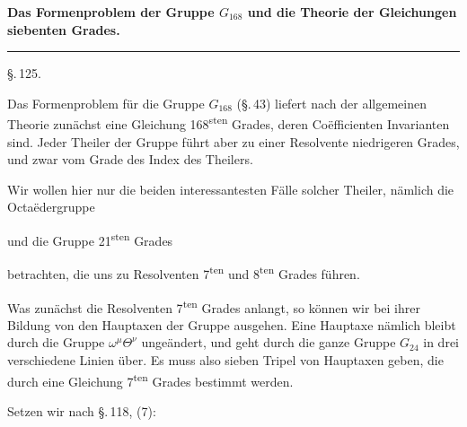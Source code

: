 
\begin{center}

\textbf{Das Formenproblem der Gruppe $G_{168}$ und die Theorie der Gleichungen siebenten Grades.}

\rule{4cm}{0.4pt}

\S.\,125.

\end{center}

Das Formenproblem für die Gruppe $G_{168}$ (\S.\,43) liefert nach der allgemeinen Theorie zunächst eine Gleichung 168\textsuperscript{sten} Grades, deren Coëfficienten Invarianten sind. Jeder Theiler der Gruppe führt aber zu einer Resolvente niedrigeren Grades, und zwar vom Grade des Index des Theilers.

Wir wollen hier nur die beiden interessantesten Fälle solcher Theiler, nämlich die Octaëdergruppe


und die Gruppe 21\textsuperscript{sten} Grades


betrachten, die uns zu Resolventen 7\textsuperscript{ten} und 8\textsuperscript{ten} Grades führen.

Was zunächst die Resolventen 7\textsuperscript{ten} Grades anlangt, so können wir bei ihrer Bildung von den Hauptaxen der Gruppe ausgehen. Eine Hauptaxe nämlich bleibt durch die Gruppe $\omega^\mu \Theta^\nu$ ungeändert, und geht durch die ganze Gruppe $G_{24}$ in drei verschiedene Linien über. Es muss also sieben Tripel von Hauptaxen geben, die durch eine Gleichung 7\textsuperscript{ten} Grades bestimmt werden.

Setzen wir nach \S.\,118, (7):

